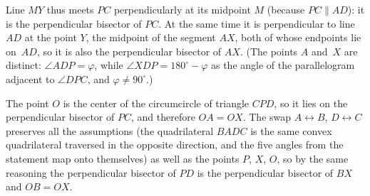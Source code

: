 {    Line $MY$ thus meets $PC$ perpendicularly at its midpoint $M$ (because $PC \parallel AD$): it is the perpendicular bisector of $PC$. At the same time it is perpendicular to line $AD$ at the point $Y$, the midpoint of the segment $AX$, both of whose endpoints lie on~$AD$, so it is also the perpendicular bisector of $AX$. (The points $A$ and~$X$ are distinct: $\angle ADP = \varphi$, while $\angle XDP = 180^\circ - \varphi$ as the angle of the parallelogram adjacent to $\angle DPC$, and $\varphi \neq 90^\circ$.)

    The point $O$ is the center of the circumcircle of triangle $CPD$, so it lies on the perpendicular bisector of $PC$, and therefore $OA = OX$. The swap $A \leftrightarrow B$, $D \leftrightarrow C$ preserves all the assumptions (the quadrilateral $BADC$ is the same convex quadrilateral traversed in the opposite direction, and the five angles from the statement map onto themselves) as well as the points $P$, $X$, $O$, so by the same reasoning the perpendicular bisector of $PD$ is the perpendicular bisector of $BX$ and $OB = OX$.
}

